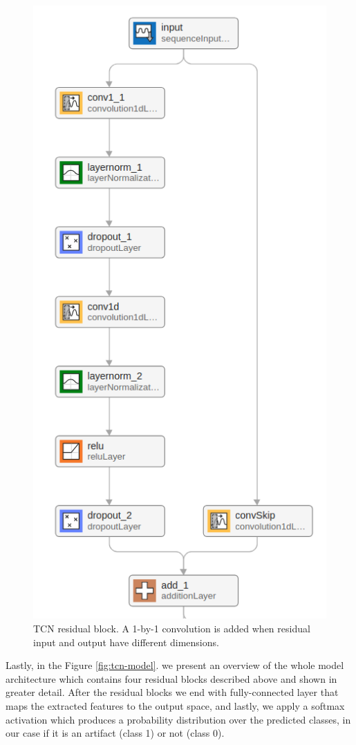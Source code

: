 \documentclass[12pt,a4paper,titlepage,openany]{report}
\begin{document}
\begin{figure}[H]
    \centering
    \includegraphics[width=0.5\linewidth]{images/Chapter3_Methodology/residual.png}
    \caption{TCN residual block. A 1-by-1 convolution is added when residual input and output have different dimensions.}
    \label{fig:residual-block}
\end{figure}

Lastly, in the Figure \ref{fig:tcn-model}. we present an overview of the whole model architecture which contains four residual blocks described above and shown in greater detail. After the residual blocks we end with fully-connected layer that maps the extracted features to the output space, and lastly, we apply a softmax activation which produces a probability distribution over the predicted classes, in our case if it is an artifact (class 1) or not (class 0).
\end{document}
